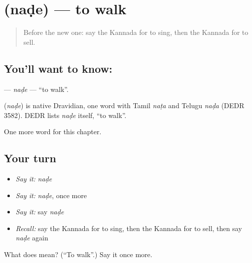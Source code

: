 \section[\texorpdfstring{\kn{ನಡೆ} (naḍe)}{ನಡೆ (naḍe)}]{ (naḍe) — to walk}

\label{lesson:KA-C152-nade}



\begin{quote}
Before the new one: say the Kannada for to sing, then the Kannada for to sell.
\end{quote}

\subsection*{You'll want to know: }
\textbf{} — \emph{naḍe} — \textquotedblleft{}to walk\textquotedblright{}.

\begin{cousinweb}
\textbf{} (\emph{naḍe}) is native Dravidian, one word with Tamil \emph{naṭa} and Telugu \emph{naḍa} (DEDR 3582). DEDR lists \emph{naḍe} itself, \textquotedblleft{}to walk\textquotedblright{}.
\end{cousinweb}

\begin{grammarlens}[title={What you've built}]
One more word for this chapter.
\end{grammarlens}

\subsection*{Your turn}
\begin{itemize}
\raggedright
  \item \emph{Say it:} \emph{naḍe}
  \item \emph{Say it:} \emph{naḍe}, once more
  \item \emph{Say it:} say \emph{naḍe}
  \item \emph{Recall:} say the Kannada for to sing, then the Kannada for to sell, then say \emph{naḍe} again
\end{itemize}

\begin{tcolorbox}[breakable,colback=teal!4,colframe=teal!35!black,title={Before you move on}]
What does  mean? (\textquotedblleft{}To walk\textquotedblright{}.) Say it once more.
\end{tcolorbox}
